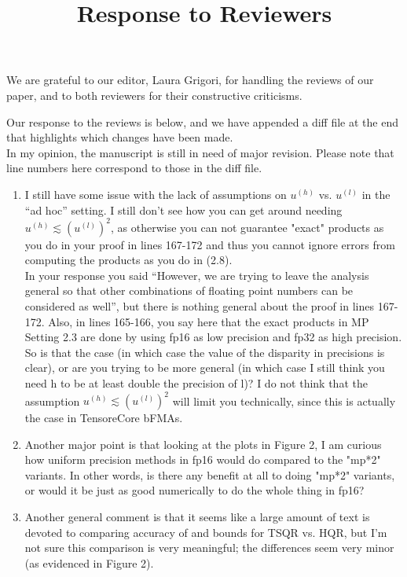 \documentclass[final,onefignum,onetabnum]{siamart190516}
\begin{document}
\title{Response to Reviewers}
\date{}
\maketitle
We are grateful to our editor, Laura Grigori, for handling the reviews of our paper, and to both reviewers for their constructive criticisms.

Our response to the reviews is below, and we have appended a diff file at the end that highlights which changes have been made.\\

In my opinion, the manuscript is still in need of major revision. 
Please note that line numbers here correspond to those in the diff file.
\begin{enumerate}
	\item I still have some issue with the lack of assumptions on $u^{(h)}$ vs. $u^{(l)}$ in the ``ad hoc'' setting. I still don't see how you can get around needing $u^{(h)} \lesssim (u^{(l)})^2$, as otherwise you can not guarantee "exact" products as you do in your proof in lines 167-172 and thus you cannot ignore errors from computing the products as you do in (2.8). \\
	In your response you said ``However, we are trying to leave the analysis general so that other combinations of floating point numbers can be considered as well'', but there is nothing general about the proof in lines 167-172.  Also, in lines 165-166, you say here that the exact products in MP Setting 2.3 are done by using fp16 as low precision and fp32 as high precision. So is that the case (in which case the value of the disparity in precisions is clear), or are you trying to be more general (in which case I still think you need h to be at least double the precision of l)? I do not think that the assumption $u^{(h)} \lesssim (u^{(l)})^2$ will limit you technically, since this is actually the case in TensoreCore bFMAs.
	
	\item Another major point is that looking at the plots in Figure 2, I am curious how uniform precision methods in fp16 would do compared to the "mp*2" variants. In other words, is there any benefit at all to doing "mp*2" variants, or would it be just as good numerically to do the whole thing in fp16?
	
	\item Another general comment is that it seems like a large amount of text is devoted to comparing accuracy of and bounds for TSQR vs. HQR, but I'm not sure this comparison is very meaningful; the differences seem very minor (as evidenced in Figure 2).
	

\end{enumerate}
\end{document}
